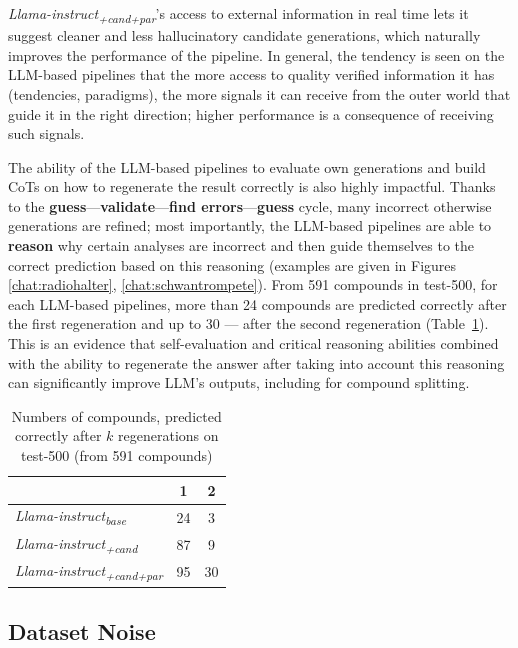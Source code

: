\documentclass[11pt]{article}
\begin{document}
\textit{Llama-instruct\textsubscript{+cand+par}}'s access to external information in real time lets it suggest cleaner and less hallucinatory candidate generations, which naturally improves the performance of the pipeline. In general, the tendency is seen on the LLM-based pipelines that the more access to quality verified information it has (tendencies, paradigms), the more signals it can receive from the outer world that guide it in the right direction; higher performance is a consequence of receiving such signals. 

The ability of the LLM-based pipelines to evaluate own generations and build CoTs on how to regenerate the result correctly is also highly impactful. Thanks to the \textbf{guess}---\textbf{validate}---\textbf{find errors}---\textbf{guess} cycle, many incorrect otherwise generations are refined; most importantly, the LLM-based pipelines are able to \textbf{reason} why certain analyses are incorrect and then guide themselves to the correct prediction based on this reasoning (examples are given in Figures \ref{chat:radiohalter}, \ref{chat:schwantrompete}). From 591 compounds in test-500, for each LLM-based pipelines, more than 24 compounds are predicted correctly after the first regeneration and up to 30 --- after the second regeneration (Table~\ref{tab:regenerations}). This is an evidence that self-evaluation and critical reasoning abilities combined with the ability to regenerate the answer after taking into account this reasoning can significantly improve LLM's outputs, including for compound splitting.


\begin{table}[htb!]
    \centering
    \renewcommand{\arraystretch}{1.02}
    \begin{tabular}{@{}lcc@{}}
        \toprule
         & 1 & 2 \\ \midrule
         \textit{Llama-instruct\textsubscript{base}} & 24 & 3 \\
         \textit{Llama-instruct\textsubscript{+cand}} & 87 & 9 \\
         \textit{Llama-instruct\textsubscript{+cand+par}} & 95 & 30 \\
        \bottomrule
    \end{tabular}
    \caption{Numbers of compounds, predicted correctly after $k$ regenerations on test-500 (from 591 compounds)}
    \label{tab:regenerations}
\end{table}


\subsection{Dataset Noise}
\end{document}
